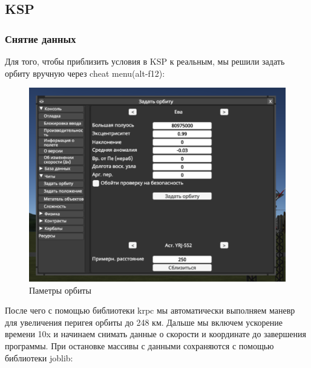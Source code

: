 \documentclass{article}
\begin{document}
    \subsection{KSP}
    \subsubsection{Снятие данных}
    Для того, чтобы приблизить условия в KSP к реальным, мы решили задать орбиту вручную через cheat menu(alt-f12):
     \begin{figure}[H]
         \centering
         \includegraphics[width=0.5\linewidth]{images/orbit_params.png}
         \caption{Паметры орбиты}
         \label{fig:enter-label}
     \end{figure}
     После чего с помощью библиотеки krpc мы автоматически выполняем маневр для увеличения перигея орбиты до 248 км. Дальше мы включем ускорение времени 10x и начинаем снимать данные о скорости и координате до завершения программы. При остановке массивы с данными сохраняются с помощью библиотеки joblib:
\end{document}
